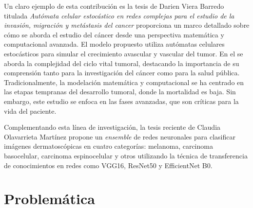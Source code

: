 Un claro ejemplo de esta contribución es la tesis de Darien Viera Barredo titulada \textit{Autómata celular estocástico en redes complejas para el estudio de la invasión, migración y metástasis del cancer}  proporciona un marco detallado sobre cómo se aborda el estudio del cáncer desde una perspectiva matemática y computacional avanzada. El modelo propuesto utiliza autómatas celulares estocásticos para simular el crecimiento avascular y vascular del tumor. En el se aborda la complejidad del ciclo vital tumoral, destacando la importancia de su comprensión tanto para la investigación del cáncer como para la salud pública. Tradicionalmente, la modelación matemática y computacional se ha centrado en las etapas tempranas del desarrollo tumoral, donde la mortalidad es baja. Sin embargo, este estudio se enfoca en las fases avanzadas, que son críticas para la vida del paciente.

Complementando esta línea de investigación, la tesis reciente de Claudia Olavarrieta Martínez  propone un \textit{ensemble} de redes neuronales para clasificar imágenes dermatoscópicas en cuatro categorías: melanoma, carcinoma basocelular, carcinoma espinocelular y otros utilizando la técnica de transferencia de conocimientos en redes como VGG16, ResNet50 y EfficientNet B0.

\section*{Problemática}

